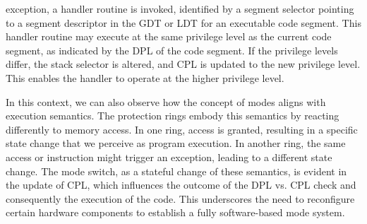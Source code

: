exception, a handler routine is invoked, identified by a segment selector
pointing to a segment descriptor in the GDT or LDT for an executable code
segment. This handler routine may execute at the same privilege level as the
current code segment, as indicated by the DPL of the code segment. If the
privilege levels differ, the stack selector is altered, and CPL is updated to
the new privilege level. This enables the handler to operate at the higher
privilege level.\par
In this context, we can also observe how the concept of modes aligns with
execution semantics. The protection rings embody this semantics by reacting
differently to memory access. In one ring, access is granted, resulting in a
specific state change that we perceive as program execution. In another ring,
the same access or instruction might trigger an exception, leading to a
different state change. The mode switch, as a stateful change of
these semantics, is evident in the update of CPL, which influences the outcome
of the DPL vs. CPL check and consequently the execution of the code. This
underscores the need to reconfigure certain hardware components to establish a
fully software-based mode system. 

